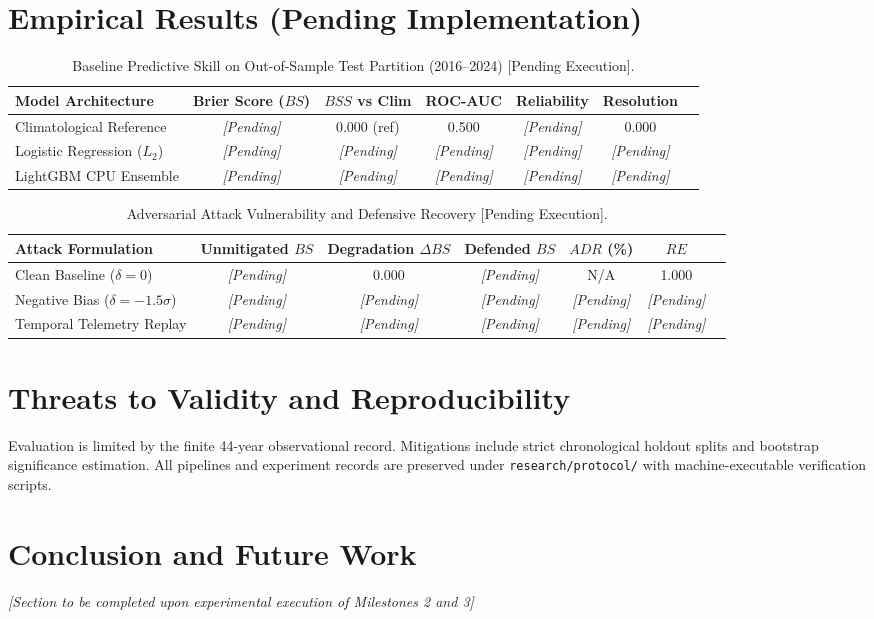 \documentclass[runningheads]{llncs}
\begin{document}
\section{Empirical Results (Pending Implementation)}
\begin{table}[ht]
\centering
\caption{Baseline Predictive Skill on Out-of-Sample Test Partition (2016--2024) [Pending Execution].}
\label{tab:baseline}
\begin{tabular}{lcccccc}
\toprule
Model Architecture & Brier Score ($BS$) & $BSS$ vs Clim & ROC-AUC & Reliability & Resolution \\
\midrule
Climatological Reference & \textit{[Pending]} & 0.000 (ref) & 0.500 & \textit{[Pending]} & 0.000 \\
Logistic Regression ($L_2$) & \textit{[Pending]} & \textit{[Pending]} & \textit{[Pending]} & \textit{[Pending]} & \textit{[Pending]} \\
LightGBM CPU Ensemble & \textit{[Pending]} & \textit{[Pending]} & \textit{[Pending]} & \textit{[Pending]} & \textit{[Pending]} \\
\bottomrule
\end{tabular}
\end{table}

\begin{table}[ht]
\centering
\caption{Adversarial Attack Vulnerability and Defensive Recovery [Pending Execution].}
\label{tab:security}
\begin{tabular}{lcccccc}
\toprule
Attack Formulation & Unmitigated $BS$ & Degradation $\Delta BS$ & Defended $BS$ & $ADR$ (\%) & $RE$ \\
\midrule
Clean Baseline ($\delta=0$) & \textit{[Pending]} & 0.000 & \textit{[Pending]} & N/A & 1.000 \\
Negative Bias ($\delta = -1.5\sigma$) & \textit{[Pending]} & \textit{[Pending]} & \textit{[Pending]} & \textit{[Pending]} & \textit{[Pending]} \\
Temporal Telemetry Replay & \textit{[Pending]} & \textit{[Pending]} & \textit{[Pending]} & \textit{[Pending]} & \textit{[Pending]} \\
\bottomrule
\end{tabular}
\end{table}

\section{Threats to Validity and Reproducibility}
Evaluation is limited by the finite 44-year observational record. Mitigations include strict chronological holdout splits and bootstrap significance estimation. All pipelines and experiment records are preserved under \texttt{research/protocol/} with machine-executable verification scripts.

\section{Conclusion and Future Work}
\textit{[Section to be completed upon experimental execution of Milestones 2 and 3]}



\end{document}
